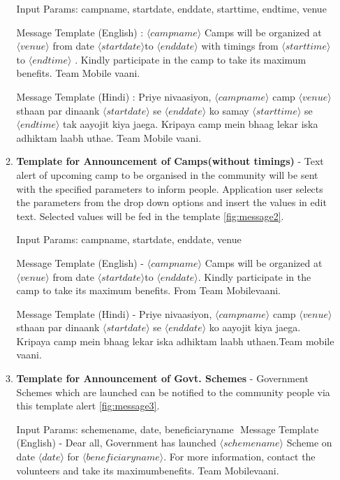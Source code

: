 \begin{itemize}
\begin{enumerate}
Input Params: campname,  startdate, enddate,  starttime, endtime, venue
 
Message Template (English) : $\langle campname \rangle$ Camps will be organized at $\langle venue \rangle$  from ​date $\langle startdate \rangle$  ​to $\langle enddate \rangle$  with timings from $\langle start time \rangle$  to $\langle end time \rangle$ . Kindly participate in the camp to take​ its maximum benefits. Team Mobile vaani.

Message Template (Hindi) : Priye nivaasiyon​, $\langle campname \rangle$  camp $\langle venue \rangle$  sthaan par dinaank $\langle startdate \rangle$  se $\langle enddate \rangle$  ko samay $\langle start time \rangle$  se $\langle endtime \rangle$  tak aayojit kiya jaega. Kripaya camp mein bhaag lekar iska adhiktam laabh uthae. Team Mobile vaani. 


\item \textbf {Template for Announcement of Camps(without timings)} - Text alert of upcoming camp to be organised in the community will be sent with the specified parameters to inform people. Application user selects the parameters from the drop down options and insert the values in edit text. Selected values will be fed in the template \ref{fig:message2}.

Input Params: campname, startdate, enddate, venue

Message Template (English) - $\langle campname \rangle$ Camps will be organized at $\langle venue \rangle$ from ​date $\langle startdate \rangle$ ​to $\langle enddate \rangle$. Kindly participate in the camp to take​ its maximum ​benefits. From Team Mobilevaani.
 
Message Template (Hindi) - Priye nivaasiyon​, $\langle campname \rangle$ camp $\langle venue \rangle$ sthaan par dinaank $\langle startdate \rangle$ se $\langle enddate \rangle$ ko aayojit kiya jaega. Kripaya camp mein bhaag lekar iska adhiktam laabh uthaen.Team mobile vaani.

\item \textbf {Template for Announcement of Govt. Schemes} - Government Schemes which are launched can be notified to the community people via this template alert \ref{fig:message3}.

Input Params: schemename, date, beneficiaryname 
    ​
​Message Template (English) - Dear all, Government has launched $\langle schemename \rangle$ Scheme on date $\langle date \rangle$ for $\langle beneficiaryname \rangle$​. For more information, contact the volunteers ​and take​ its maximum ​benefits. Team ​Mobilevaani. 
 

\end{enumerate}
\end{itemize}
